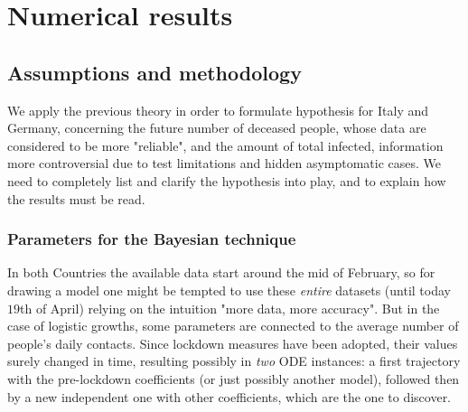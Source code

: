 \documentclass[8pt]{article}
\begin{document}

\section{Numerical results}

\subsection{Assumptions and methodology}
We apply the previous theory in order to formulate hypothesis 
for Italy and Germany, concerning the future number of
deceased people, whose data are considered to be more "reliable",
and the amount of total infected, information more controversial
due to test limitations and hidden asymptomatic cases.
We need to completely list and clarify the hypothesis into play,
and to explain how the results must be read.


\subsubsection{Parameters for the Bayesian technique}
In both Countries the available data start around the mid
of February, so for drawing a model 
one might be tempted to use these \emph{entire}
datasets (until today $19$th of April)
relying on the intuition "more data, more accuracy".
But in the case of logistic growths,
some parameters are connected to the average number of people's
daily contacts. Since lockdown measures have been adopted,
their values surely changed in time, resulting possibly 
in \emph{two} ODE instances: a first trajectory with the pre-lockdown
coefficients (or just possibly another model),
followed then
by a new independent one with other 
coefficients, which are the one to discover.
\end{document}
